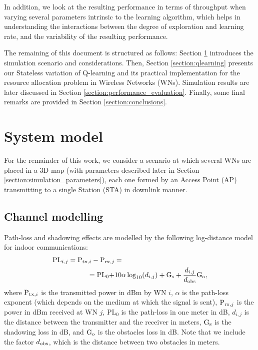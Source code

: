 \documentclass[conference]{IEEEtran}
\begin{document}
	In addition, we look at the resulting performance in terms of throughput when varying several parameters intrinsic to the learning algorithm, which helps in understanding the interactions between the degree of exploration and learning rate, and the variability of the resulting performance. 
	
	The remaining of this document is structured as follows: Section \ref{section:system_model} introduces the simulation scenario and considerations. Then, Section \ref{section:qlearning} presents our Stateless variation of Q-learning and its practical implementation for the resource allocation problem in Wireless Networks (WNs). Simulation results are later discussed in Section \ref{section:performance_evaluation}. Finally, some final remarks are provided in Section \ref{section:conclusions}. 
	
	\section{System model}
	\label{section:system_model}	
	
	For the remainder of this work, we consider a scenario at which several WNs are placed in a 3D-map (with parameters described later in Section \ref{section:simulation_parameters}), each one formed by an Access Point (AP) transmitting to a single Station (STA) in downlink manner. 
	
	\subsection{Channel modelling}
	\label{section:channel_modelling}	
	
	Path-loss and shadowing effects are modelled by the following log-distance model for indoor communications:	
	\begin{align}
	\text{PL}_{i,j} = \text{P}_{{\rm tx},i} - \text{P}_{{\rm rx},j} & = \nonumber \\ = \text{PL}_0 + & 10  \alpha  \log_{10}(d_{i,j}) + \text{G}_{{\rm s}} + \frac{d_{i,j}}{d_{{\rm obs}}} \text{G}_{{\rm o}}, \nonumber
	\end{align}
	where $\text{P}_{{\rm tx},i}$ is the transmitted power in dBm by WN $i$, $\alpha$ is the path-loss exponent (which depends on the medium at which the signal is sent), $\text{P}_{{\rm rx},j}$ is the power in dBm received at WN $j$, $\text{PL}_0$ is the path-loss in one meter in dB, $d_{i,j}$ is the distance between the transmitter and the receiver in meters, $\text{G}_{{\rm s}}$ is the shadowing loss in dB, and $\text{G}_{{\rm o}}$ is the obstacles loss in dB. Note that we include the factor $d_{{\rm obs}}$, which is the distance between two obstacles in meters. 
	
\end{document}
